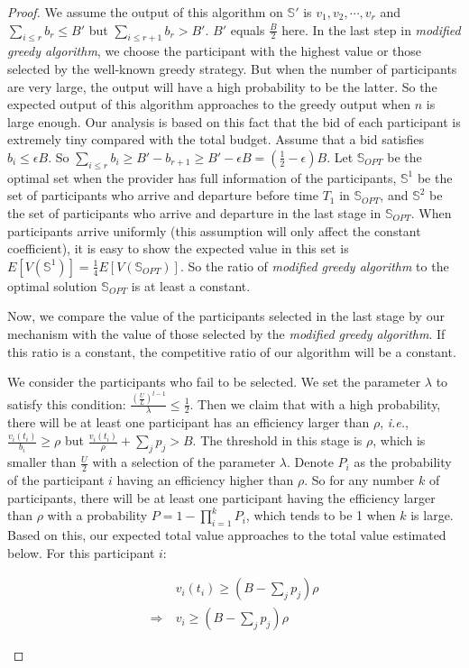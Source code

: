 \documentclass[conference,compsocconf,letterpaper,10pt]{IEEEtran}
\newcommand{\ie}{{\em i.e.}}
\begin{document}
\begin{proof}
We assume the output of this algorithm on $\mathbb{S}'$ is ${v_1,v_2,\cdots, v_r}$ and $\sum_{i \le r} b_r \le B'$ but $\sum_{i \le r+1} b_r > B' $. $B'$ equals $\frac{B}{2}$ here. In the last step in \emph{modified greedy algorithm}, we choose the participant with the highest value or those selected by the  well-known greedy strategy. But when the number of participants are very large, the output will have a high probability to be the latter. So the expected output of this algorithm approaches to the greedy output when $n$ is large enough. Our analysis is based on this fact that the bid of each participant is extremely tiny compared with the total budget. Assume that a bid satisfies $b_i \le \epsilon B$. So $\sum_{i \le r} b_i \ge B'-b_{r+1} \ge B'-\epsilon B =(\frac{1}{2}-\epsilon)B$. Let $\mathbb{S}_{OPT}$ be the optimal set when the provider has full information of the participants, $\mathbb{S}^1$ be the set of participants who arrive and departure before time $T_1$ in $\mathbb{S}_{OPT}$, and $\mathbb{S}^2$ be the set of participants who arrive and departure in the last stage in $\mathbb{S}_{OPT}$. When participants arrive uniformly (this assumption will only affect the constant coefficient), it is easy to show the expected value in this set is $E[V(\mathbb{S}^1)]=\frac{1}{4}E[V(\mathbb{S}_{OPT})]$. So the ratio of \emph{modified greedy algorithm} to the optimal solution $\mathbb{S}_{OPT}$ is at least a constant.

Now, we compare the value of the participants selected in the last stage by our mechanism with the value of those selected by the \emph{modified greedy algorithm}. If this ratio is a constant, the competitive ratio of our algorithm will be a constant.

We consider the participants who fail to be selected. We set the parameter $\lambda$ to satisfy this condition: $\frac{\left(\frac{U}{L}\right)^{l-1}}{\lambda} \le \frac{1}{2}$. Then we claim that with a high probability, there will be at least one participant has an efficiency larger than $\rho$, \ie, $\frac{v_i(t_i)}{b_i} \ge \rho$ but $\frac{v_i(t_i)}{\rho }+\sum_{j}p_j > B$. The threshold in this stage is $\rho$, which is smaller than $\frac{U}{2}$ with a selection of the parameter $\lambda$. Denote $P_i$ as the probability of the participant $i$ having an efficiency higher than $\rho$. So for any number $k$ of participants, there will be at least one participant having the efficiency larger than $\rho$ with a probability $P=1-\prod_{i=1}^kP_i$, which tends to be 1 when $k$ is large. Based on this, our expected total value approaches to the total value estimated below. For this participant $i$:
\begin{small}
\begin{align}
\nonumber &v_i(t_i) \ge (B-\sum_{j}p_j)\rho \\
\nonumber \Rightarrow\ &v_i \ge (B-\sum_{j}p_j)\rho
\end{align}
\end{small}


\end{proof}
\end{document}
